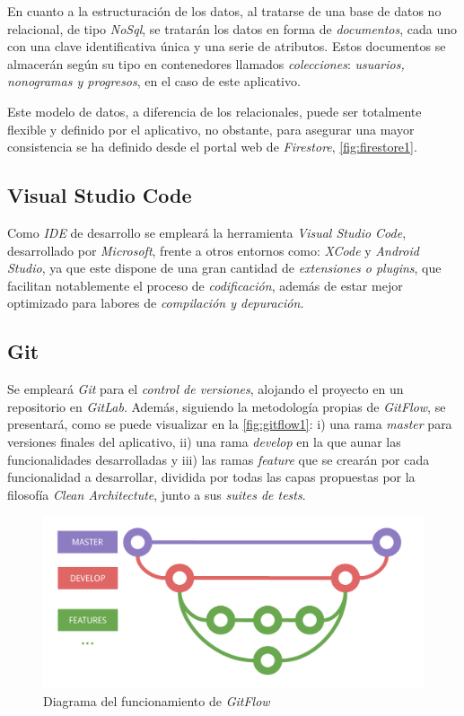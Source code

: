 En cuanto a la estructuración de los datos, al tratarse de una base de datos no relacional,
de tipo \textit{NoSql}, se tratarán los datos en forma de \textit{documentos}, cada uno con una clave identificativa única y una
serie de atributos. Estos documentos se almacerán según su tipo en contenedores llamados \textit{colecciones}:
\textit{usuarios, nonogramas y progresos}, en el caso de este aplicativo.

Este modelo de datos, a diferencia de los relacionales, puede ser totalmente flexible y definido por el aplicativo, no obstante,
para asegurar una mayor consistencia se ha definido desde el portal web de \textit{Firestore}, \autoref{fig:firestore1}.

  \subsection{Visual Studio Code}
Como \textit{IDE} de desarrollo se empleará la herramienta \textit{Visual Studio Code}, desarrollado por
\textit{Microsoft}, frente a otros entornos como: \textit{XCode} y \textit{Android Studio}, ya que este dispone
de una gran cantidad de \textit{extensiones o plugins}, que facilitan notablemente el proceso de \textit{codificación},
además de estar mejor optimizado para labores de \textit{compilación y depuración.}

\subsection{Git}
\label{sec:git}
Se empleará \textit{Git} para el \textit{control de versiones}, alojando el proyecto en un repositorio en \textit{GitLab}. Además, siguiendo la metodología propias de 
\textit{GitFlow}, se presentará, como se puede visualizar en la \autoref{fig:gitflow1}:
i) una rama \textit{master} para versiones finales del aplicativo,
ii) una rama \textit{develop} en la que aunar las funcionalidades desarrolladas y iii) las ramas
\textit{feature} que se crearán por cada funcionalidad a desarrollar, dividida por todas las capas propuestas
por la filosofía \textit{Clean Architectute}, junto a sus \textit{suites de tests}.

\begin{figure}[H]
    \centering
    \includegraphics[scale=0.6]{images/gitflow1.pdf}
    \caption{Diagrama del funcionamiento de \textit{GitFlow}}
    \label{fig:gitflow1}
  \end{figure}

